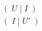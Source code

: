 \documentclass[preview]{standalone}
\begin{document}
\begin{align*}
&(  \;U\; \big| \; I \; ) \\ &(\;I \; \big| \; U'\; )
\end{align*}
\end{document}
